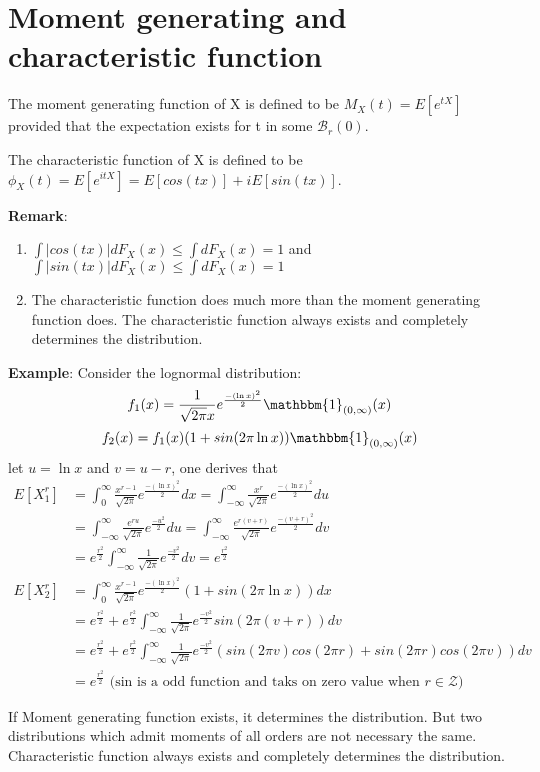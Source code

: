 \documentclass[11pt]{article}
\begin{document}
\section{Moment generating and characteristic function}
\begin{definition}
The moment generating function of X is defined to be $M_X(t)=E[e^{tX}]$ provided that the expectation exists for t in some $\mathcal{B}_r(0)$.
\end{definition}
\begin{definition}
The characteristic function of X is defined to be $\phi_X(t)=E[e^{itX}]=E[cos(tx)]+iE[sin(tx)]$. 
\end{definition}
{\bf Remark}:
\begin{enumerate}
\item $\int|cos(tx)|dF_X(x)\leq\int dF_X(x)=1$ and $\int|sin(tx)|dF_X(x)\leq\int dF_X(x)=1$
\item The characteristic function does much more than the moment generating function does. The characteristic function always exists and completely determines the distribution.
\end{enumerate}
{\bf Example}:
Consider the lognormal distribution: $$f_1(x)=\frac{1}{\sqrt{2\pi}x}e^{\frac{-(\ln x)^2}{2}}\mathbbm{1}_{(0,\infty)}(x)$$
$$f_2(x)=f_1(x)(1+sin(2\pi\ln x))\mathbbm{1}_{(0,\infty)}(x)$$
let $u=\ln x$ and $v=u-r$, one derives that
\begin{align*}
E[X_1^r]&=\int_0^\infty\frac{x^{r-1}}{\sqrt{2\pi}}e^{\frac{-(\ln x)^2}{2}}dx
=\int_{-\infty}^\infty\frac{x^r}{\sqrt{2\pi}}e^{\frac{-(\ln x)^2}{2}}du\\
&=\int_{-\infty}^\infty\frac{e^{ru}}{\sqrt{2\pi}}e^{\frac{-u^2}{2}}du=\int_{-\infty}^\infty\frac{e^{r(v+r)}}{\sqrt{2\pi}}e^{\frac{-(v+r)^2}{2}}dv\\
&=e^{\frac{r^2}{2}}\int_{-\infty}^{\infty}\frac{1}{\sqrt{2\pi}}e^{\frac{-v^2}{2}}dv=e^{\frac{r^2}{2}}\\
E[X_2^r]&=\int_0^\infty\frac{x^{r-1}}{\sqrt{2\pi}}e^{\frac{-(\ln x)^2}{2}}(1+sin(2\pi\ln x))dx
\\
&=e^{\frac{r^2}{2}}+e^{\frac{r^2}{2}}\int_{-\infty}^{\infty}\frac{1}{\sqrt{2\pi}}e^{\frac{-v^2}{2}}sin(2\pi (v+r))dv\\
&=e^{\frac{r^2}{2}}+e^{\frac{r^2}{2}}\int_{-\infty}^{\infty}\frac{1}{\sqrt{2\pi}}e^{\frac{-v^2}{2}}(sin(2\pi v)cos(2\pi r)+sin(2\pi r)cos(2\pi v))dv\\
&=e^{\frac{r^2}{2}} \mbox{ (sin is a odd function and taks on zero value when $r\in\mathcal{Z}$)}
\end{align*}
\begin{intuition}
If Moment generating function exists, it determines the distribution. But two distributions which admit moments of all orders are not necessary the same. Characteristic function always exists and completely determines the distribution.
\end{intuition}
\end{document}
